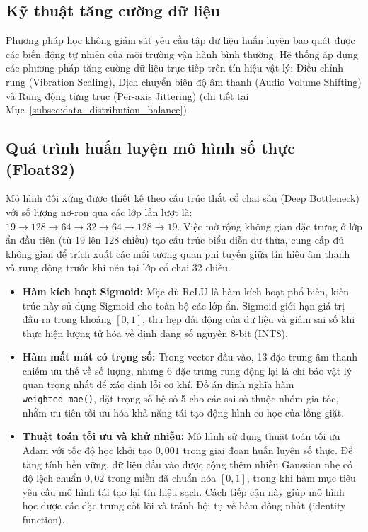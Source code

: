 \subsection{Kỹ thuật tăng cường dữ liệu}
Phương pháp học không giám sát yêu cầu tập dữ liệu huấn luyện bao quát được các biến động tự nhiên của môi trường vận hành bình thường. Hệ thống áp dụng các phương pháp tăng cường dữ liệu trực tiếp trên tín hiệu vật lý: Điều chỉnh rung (Vibration Scaling), Dịch chuyển biên độ âm thanh (Audio Volume Shifting) và Rung động từng trục (Per-axis Jittering) (chi tiết tại Mục~\ref{subsec:data_distribution_balance}).

\subsection{Quá trình huấn luyện mô hình số thực (Float32)}

Mô hình đối xứng được thiết kế theo cấu trúc thắt cổ chai sâu (Deep Bottleneck) với số lượng nơ-ron qua các lớp lần lượt là: $19 \rightarrow 128 \rightarrow 64 \rightarrow 32 \rightarrow 64 \rightarrow 128 \rightarrow 19$. Việc mở rộng không gian đặc trưng ở lớp ẩn đầu tiên (từ 19 lên 128 chiều) tạo cấu trúc biểu diễn dư thừa, cung cấp đủ không gian để trích xuất các mối tương quan phi tuyến giữa tín hiệu âm thanh và rung động trước khi nén tại lớp cổ chai 32 chiều.

\begin{itemize}
    \item \textbf{Hàm kích hoạt Sigmoid:} Mặc dù ReLU là hàm kích hoạt phổ biến, kiến trúc này sử dụng Sigmoid cho toàn bộ các lớp ẩn. Sigmoid giới hạn giá trị đầu ra trong khoảng $[0, 1]$, thu hẹp dải động của dữ liệu và giảm sai số khi thực hiện lượng tử hóa về định dạng số nguyên 8-bit (INT8).
    
    \item \textbf{Hàm mất mát có trọng số:} Trong vector đầu vào, 13 đặc trưng âm thanh chiếm ưu thế về số lượng, nhưng 6 đặc trưng rung động lại là chỉ báo vật lý quan trọng nhất để xác định lỗi cơ khí. Đồ án định nghĩa hàm \texttt{weighted\_mae()}, đặt trọng số hệ số 5 cho các sai số thuộc nhóm gia tốc, nhằm ưu tiên tối ưu hóa khả năng tái tạo động hình cơ học của lồng giặt.
    
    \item \textbf{Thuật toán tối ưu và khử nhiễu:} Mô hình sử dụng thuật toán tối ưu Adam \cite{ref_adam} với tốc độ học khởi tạo $0{,}001$ trong giai đoạn huấn luyện số thực. Để tăng tính bền vững, dữ liệu đầu vào được cộng thêm nhiễu Gaussian nhẹ có độ lệch chuẩn $0{,}02$ trong miền đã chuẩn hóa $[0,1]$, trong khi hàm mục tiêu yêu cầu mô hình tái tạo lại tín hiệu sạch. Cách tiếp cận này giúp mô hình học được các đặc trưng cốt lõi và tránh hội tụ về hàm đồng nhất (identity function).
\end{itemize}

